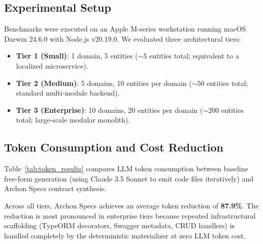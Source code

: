 \subsection{Experimental Setup}
Benchmarks were executed on an Apple M-series workstation running macOS Darwin 24.6.0 with Node.js v20.19.0. We evaluated three architectural tiers:
\begin{itemize}[leftmargin=*]
  \item \textbf{Tier 1 (Small)}: 1 domain, 5 entities ($\sim 5$ entities total; equivalent to a localized microservice).
  \item \textbf{Tier 2 (Medium)}: 5 domains, 10 entities per domain ($\sim 50$ entities total; standard multi-module backend).
  \item \textbf{Tier 3 (Enterprise)}: 10 domains, 20 entities per domain ($\sim 200$ entities total; large-scale modular monolith).
\end{itemize}

\subsection{Token Consumption and Cost Reduction}
Table~\ref{tab:token_results} compares LLM token consumption between baseline free-form generation (using Claude 3.5 Sonnet to emit code files iteratively) and Archon Specs contract synthesis.

\begin{table}[t]
  \centering
  \caption{\textbf{LLM Token Consumption and Reduction Rates.} Comparison of generative tokens consumed during system materialization.}
  \label{tab:token_results}
\end{table}

Across all tiers, Archon Specs achieves an average token reduction of \textbf{87.9\%}. The reduction is most pronounced in enterprise tiers because repeated infrastructural scaffolding (TypeORM decorators, Swagger metadata, CRUD handlers) is handled completely by the deterministic materializer at zero LLM token cost.

